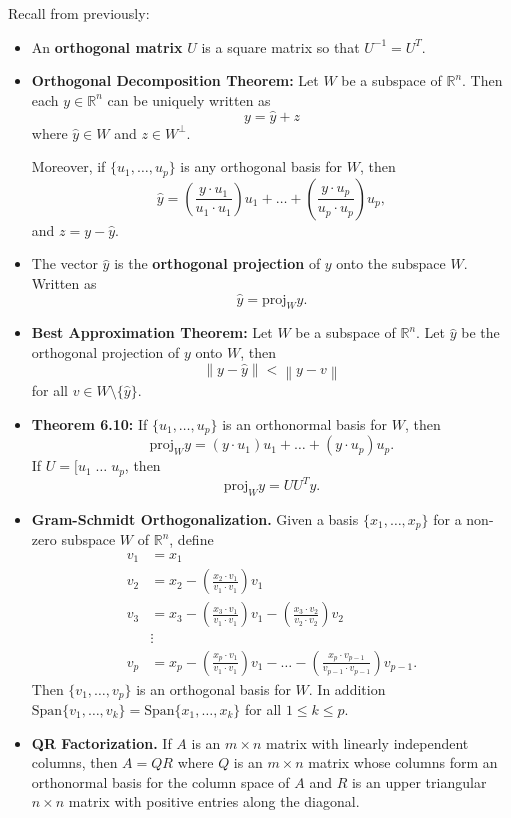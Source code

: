 \documentclass[12pt,letterpaper]{article}
\newcommand{\norm}[1]{\left\lVert#1\right\rVert}
\begin{document}
\thispagestyle{fancy}

Recall from previously:

\begin{itemize}
\item An {\bf orthogonal matrix} $U$ is a square matrix so that $U^{-1}=U^{T}$.
\item  {\bf Orthogonal Decomposition Theorem:} Let $W$ be a subspace of $\mathbb{R}^n$. Then each $y \in \mathbb{R}^n$ can be uniquely written as $$y=\hat{y} + z$$ where $\hat{y} \in W$ and $z \in W^{\perp}$. 

Moreover, if $\{u_1, \dots, u_p\}$ is any orthogonal basis for $W$, then $$\hat{y}= \left(\frac{y \cdot u_1}{u_1 \cdot u_1} \right)u_1+\dots+  \left(\frac{y \cdot u_p}{u_p \cdot u_p} \right)u_p,$$ and $z=y-\hat{y}$.
\item The vector $\hat{y}$ is the {\bf orthogonal projection} of $y$ onto the subspace $W$. Written as $$\hat{y}=\text{proj}_{W}{y}.$$
\item {\bf Best Approximation Theorem:} Let $W$ be a subspace of $\mathbb{R}^n$. Let $\hat{y}$ be the orthogonal projection of $y$ onto $W$, then $$\norm{y-\hat{y}} < \norm{y-v}$$ for all $v\in W \setminus \{\hat{y}\}$.
\item {\bf Theorem 6.10:} If $\{ u_1, \dots, u_p\}$ is an orthonormal basis for $W$, then $$\text{proj}_{W}{y} =(y\cdot u_1) u_1 +\dots +(y \cdot u_p) u_p.$$ If $U=[u_1 \; \dots \; u_p$, then $$\text{proj}_{W}{y} =U U^{T} y.$$
\item {\bf Gram-Schmidt Orthogonalization.} Given a basis $\{x_1, \dots, x_p\}$ for a non-zero subspace $W$ of $\mathbb{R}^n$, define 
\begin{align*}
v_1 & = x_1\\
v_2 & = x_2 - \left( \frac{x_2 \cdot v_1}{v_1 \cdot v_1} \right) v_1\\
v_3 & = x_3 -\left( \frac{x_3 \cdot v_1}{v_1 \cdot v_1} \right) v_1-\left( \frac{x_3 \cdot v_2}{v_2 \cdot v_2} \right) v_2\\
&\vdots\\
v_p & = x_p -\left( \frac{x_p \cdot v_1}{v_1 \cdot v_1} \right) v_1-\dots -\left( \frac{x_p \cdot v_{p-1}}{v_{p-1} \cdot v_{p-1}} \right) v_{p-1}.
\end{align*}
Then $\{v_1, \dots, v_p\}$ is an orthogonal basis for $W$. In addition $\text{Span}\{v_1,\dots, v_k\}=\text{Span}\{ x_1, \dots, x_k\}$ for all $1 \leq k \leq p$.
\item {\bf QR Factorization.} If $A$ is an $m\times n$ matrix with linearly independent columns, then $A=QR$ where $Q$ is an $m\times n$ matrix whose columns form an orthonormal basis for the column space of $A$ and $R$ is an upper triangular $n \times n$ matrix with positive entries along the diagonal. 
\end{itemize}
\end{document}
